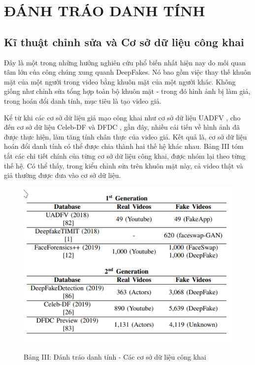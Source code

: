 \documentclass{article}
\begin{document}
\section{ĐÁNH TRÁO DANH TÍNH}\label{sec:4-identity-swap}

\subsection{Kĩ thuật chỉnh sửa và Cơ sở dữ liệu công khai} \label{sec:4-a-technique}

Đây là một trong những hướng nghiên cứu phổ biến nhất hiện nay do mối quan tâm lớn của công chúng xung quanh DeepFakes. Nó bao gồm việc thay thế khuôn mặt của một người trong video bằng khuôn mặt của một người khác. Không giống như chỉnh sửa tổng hợp toàn bộ khuôn mặt - trong đó hình ảnh bị làm giả, trong hoán đổi danh tính, mục tiêu là tạo video giả.

Kể từ khi các cơ sở dữ liệu giả mạo công khai như cơ sở dữ liệu UADFV , cho đến cơ sở dữ liệu Celeb-DF và DFDC ,  gần đây, nhiều cải tiến về hình ảnh đã được thực hiện, làm tăng tính chân thực của video giả. Kết quả là, cơ sở dữ liệu hoán đổi danh tính có thể được chia thành hai thế hệ khác nhau. Bảng III tóm tắt các chi tiết chính của từng cơ sở dữ liệu công khai, được nhóm lại theo từng thế hệ. Có thể thấy, trong kiểu chỉnh sửa trên khuôn mặt này, cả video thật và giả thường được đưa vào cơ sở dữ liệu.

\begin{figure}[h!]
\caption{Bảng III: Đánh tráo danh tính - Các cơ sở dữ liệu công khai}
\includegraphics[width=\columnwidth]{table-3-database}
\label{table-3-database}
\end{figure}
\end{document}
